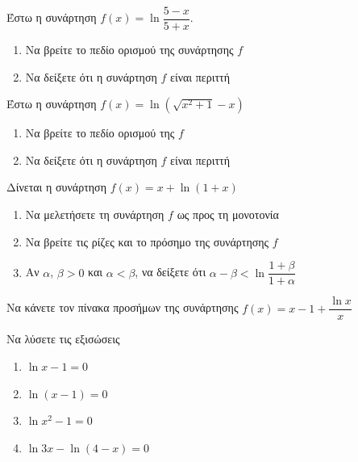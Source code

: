 \documentclass{../presentation}
\begin{document}
\begin{askisi}
  Έστω η συνάρτηση $f(x)=\ln \dfrac{5-x}{5+x}$.
  \begin{enumerate}
    \item<1-> Να βρείτε το πεδίο ορισμού της συνάρτησης $f$
    \item<2-> Να δείξετε ότι η συνάρτηση $f$ είναι περιττή
  \end{enumerate}


\end{askisi}

\begin{askisi}
  Έστω η συνάρτηση $f(x)=\ln \left( \sqrt{x^2+1}-x \right) $
  \begin{enumerate}
    \item<1-> Να βρείτε το πεδίο ορισμού της $f$
    \item<2-> Να δείξετε ότι η συνάρτηση $f$ είναι περιττή
  \end{enumerate}


\end{askisi}

\begin{askisi}
  Δίνεται η συνάρτηση $f(x)=x+\ln(1+x)$
  \begin{enumerate}
    \item<1-> Να μελετήσετε τη συνάρτηση $f$ ως προς τη μονοτονία
    \item<2-> Να βρείτε τις ρίζες και το πρόσημο της συνάρτησης $f$
    \item<3-> Αν $α$, $β>0$ και $α<β$, να δείξετε ότι $α-β<\ln \dfrac{1+β}{1+α}$
  \end{enumerate}


\end{askisi}

\begin{askisi}
  Να κάνετε τον πίνακα προσήμων της συνάρτησης $f(x)=x-1+\dfrac{\ln x}{x}$


\end{askisi}

\begin{askisi}
  Να λύσετε τις εξισώσεις
  \begin{enumerate}
    \item<1-> $\ln x-1=0$
    \item<2-> $\ln (x-1)=0$
    \item<3-> $\ln x^2-1=0$
    \item<4-> $\ln 3x-\ln(4-x)=0$
  \end{enumerate}


\end{askisi}
\end{document}
